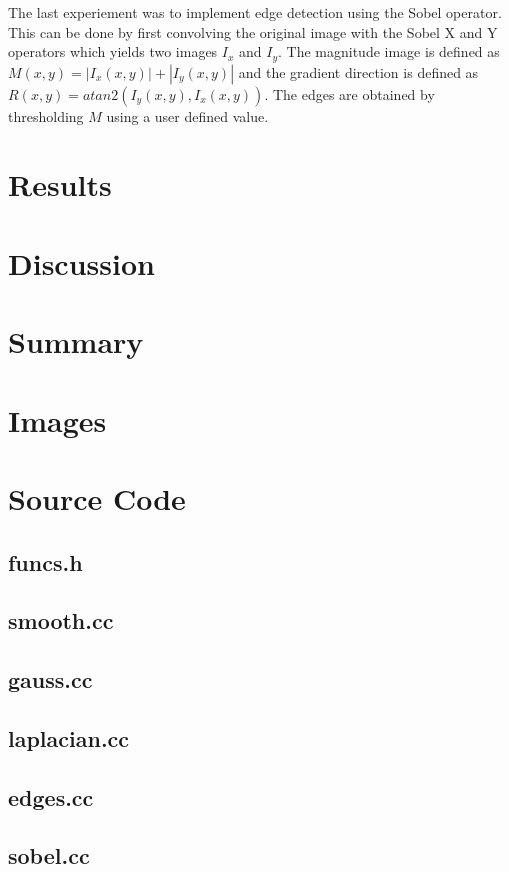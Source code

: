   The last experiement was to implement edge detection using the Sobel operator.  This can be done by first convolving the original image with the Sobel X and Y operators which yields two images $I_x$ and $I_y$.  The magnitude image is defined as $M(x,y)=|I_x(x,y)| + |I_y(x,y)|$ and the gradient direction is defined as $R(x,y)=atan2(I_y(x,y),I_x(x,y))$.  The edges are obtained by thresholding $M$ using a user defined value.

\section{Results}


%


\section{Discussion}
\section{Summary}

\newpage

\section{Images}
  
\newpage

\section{Source Code}
  \subsection{funcs.h}
    
  \subsection{smooth.cc}
    
  \subsection{gauss.cc}
    
  \subsection{laplacian.cc}
    
  \subsection{edges.cc}
    
  \subsection{sobel.cc}
    

